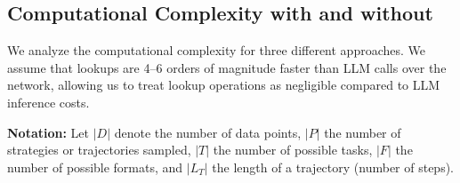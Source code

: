 






\subsection{Computational Complexity with and without \method}\label{computational_complexity}

We analyze the computational complexity for three different approaches. We assume that lookups are 4--6 orders of magnitude faster than LLM calls over the network, allowing us to treat lookup operations as negligible compared to LLM inference costs.

\textbf{Notation:} Let $|D|$ denote the number of data points, $|P|$ the number of strategies or trajectories sampled, $|T|$ the number of possible tasks, $|F|$ the number of possible formats, and $|L_T|$ the length of a trajectory (number of steps).

